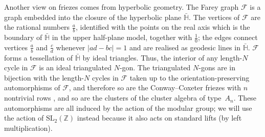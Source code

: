 \documentclass[12pt]{article}
\theoremstyle{definition}
\newcommand{\Z}{\mathbb{Z}}
\newcommand{\SL}[1]{\ensuremath{\mathrm{SL}_{#1}}}
\newcommand{\F}{\mathscr{F}}
\begin{document}
Another view on friezes comes from hyperbolic geometry. The Farey graph $\F$ is a graph embedded into the closure of the hyperbolic plane $\bar{\mathbb H}$. The vertices of $\F$ are the rational numbers $\tfrac a b$, identified with the points on the real axis which is the boundary of $\bar{\mathbb H}$ in the upper half-plane model, together with $\tfrac10$; the edges connect vertices $\tfrac a b$ and $\tfrac c d$ whenever $|ad-bc|=1$ and are realised as geodesic lines in $\bar{\mathbb H}$. $\F$ forms a tessellation of $\bar{\mathbb H}$ by ideal triangles. Thus, the interior of any length-$N$ cycle in $\F$ is an ideal triangulated $N$-gon. The triangulated $N$-gons are in bijection with the length-$N$ cycles in $\F$ taken up to the orientation-preserving automorphisms of $\F$, and therefore so are the Conway--Coxeter friezes with $n$ nontrivial rows \cite{MoOvTa2015}, and so are the clusters of the cluster algebra of type~$A_n$. These automorphisms are all induced by the action of the modular group; we will use the action of $\SL2(\Z)$ instead because it also acts on standard lifts (by left multiplication).
\end{document}
